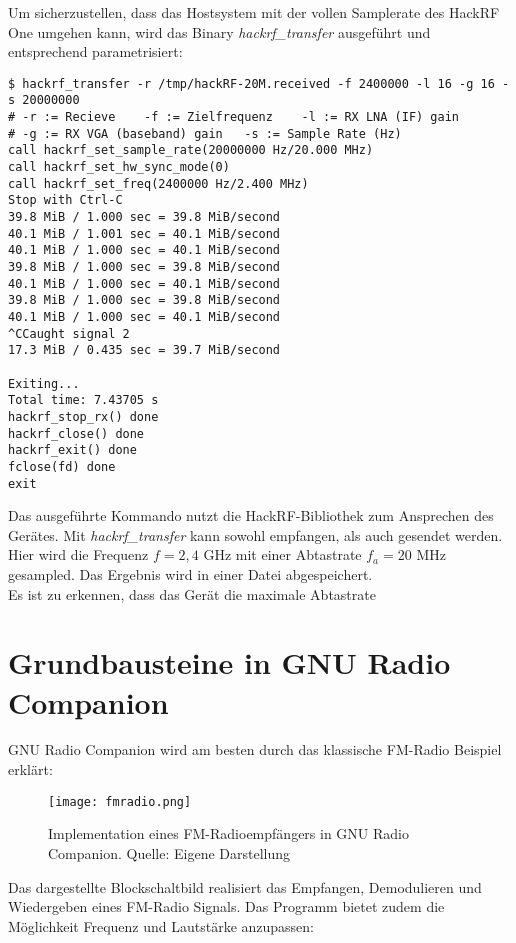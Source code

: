 \newpage
Um sicherzustellen, dass das Hostsystem mit der vollen Samplerate des HackRF One umgehen kann, wird das Binary \textit{hackrf\_transfer} ausgeführt und entsprechend parametrisiert:

\begin{lstlisting}[caption=Empfangen von Daten mit hackrf\_transfer, label=hackrf-receive]
$ hackrf_transfer -r /tmp/hackRF-20M.received -f 2400000 -l 16 -g 16 -s 20000000
# -r := Recieve    -f := Zielfrequenz    -l := RX LNA (IF) gain    
# -g := RX VGA (baseband) gain   -s := Sample Rate (Hz)
call hackrf_set_sample_rate(20000000 Hz/20.000 MHz)
call hackrf_set_hw_sync_mode(0)
call hackrf_set_freq(2400000 Hz/2.400 MHz)
Stop with Ctrl-C
39.8 MiB / 1.000 sec = 39.8 MiB/second
40.1 MiB / 1.001 sec = 40.1 MiB/second
40.1 MiB / 1.000 sec = 40.1 MiB/second
39.8 MiB / 1.000 sec = 39.8 MiB/second
40.1 MiB / 1.000 sec = 40.1 MiB/second
39.8 MiB / 1.000 sec = 39.8 MiB/second
40.1 MiB / 1.000 sec = 40.1 MiB/second
^CCaught signal 2
17.3 MiB / 0.435 sec = 39.7 MiB/second

Exiting...
Total time: 7.43705 s
hackrf_stop_rx() done
hackrf_close() done
hackrf_exit() done
fclose(fd) done
exit
\end{lstlisting}

Das ausgeführte Kommando nutzt die HackRF-Bibliothek zum Ansprechen des Gerätes. 
Mit \textit{hackrf\_transfer} kann sowohl empfangen, als auch gesendet werden. 
Hier wird die Frequenz \(f = 2,4\) GHz mit einer Abtastrate  \( f_a = 20 \) MHz gesampled.
Das Ergebnis wird in einer Datei abgespeichert. \\
Es ist zu erkennen, dass das Gerät die maximale Abtastrate

\newpage
\section{Grundbausteine in GNU Radio Companion}
GNU Radio Companion wird am besten durch das klassische FM-Radio Beispiel erklärt:

\begin{figure}[ht]
	\centering
	\texttt{[image: fmradio.png]}
	\caption[Implementation eines FM-Radioempfängers in GNU Radio Companion]{Implementation eines FM-Radioempfängers in GNU Radio Companion. Quelle: Eigene Darstellung} 
	\label{fmradio}
\end{figure}

Das dargestellte Blockschaltbild realisiert das Empfangen, Demodulieren und Wiedergeben eines FM-Radio Signals. Das Programm bietet zudem die Möglichkeit Frequenz und Lautstärke anzupassen:


